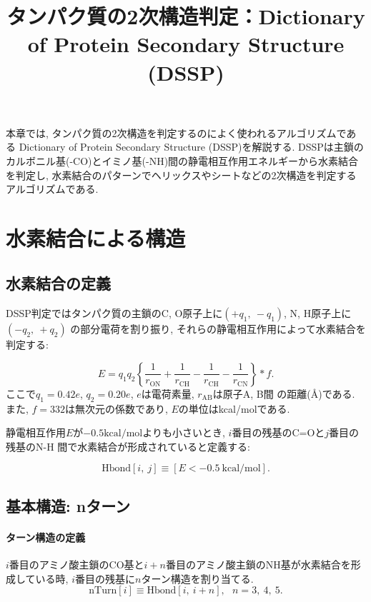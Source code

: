 





\title{タンパク質の2次構造判定：Dictionary of Protein Secondary Structure (DSSP)}
\maketitle

本章では, タンパク質の2次構造を判定するのによく使われるアルゴリズムである
Dictionary of Protein Secondary Structure (DSSP)\cite{Kabsch1983}を解説する.
DSSPは主鎖のカルボニル基(-CO)とイミノ基(-NH)間の静電相互作用エネルギーから水素結合を判定し,
水素結合のパターンでヘリックスやシートなどの2次構造を判定するアルゴリズムである.


\section{水素結合による構造}

\subsection{水素結合の定義}
DSSP判定ではタンパク質の主鎖のC, O原子上に$(+q_{1},~ -q_{1})$, N, H原子上に$(-q_{2},~ +q_{2})$
の部分電荷を割り振り, それらの静電相互作用によって水素結合を判定する:

\begin{equation}
 E = q_{1} q_{2}
     \left\{
              \frac{1}{r_{\mathrm{ON}}} + \frac{1}{r_{\mathrm{CH}}} 
            - \frac{1}{r_{\mathrm{CH}}} - \frac{1}{r_{\mathrm{CN}}} 
     \right\} * f .
\end{equation}
ここで$q_{1} = 0.42e$, $q_{2} = 0.20e$, $e$は電荷素量, $r_{\mathrm{AB}}$は原子A, B間
の距離(\AA)である. 
また, $f = 332$は無次元の係数であり, $E$の単位はkcal/molである.

静電相互作用$E$が$-0.5 \mathrm{kcal/mol}$よりも小さいとき, $i$番目の残基のC=Oと$j$番目の残基のN-H
間で水素結合が形成されていると定義する:

\begin{equation}
 \mathrm{H bond}[i,~ j]
 \equiv
 [E < -0.5 ~\mathrm{kcal/mol}] .
\end{equation}


\subsection{基本構造: nターン}
\paragraph{ターン構造の定義}
$i$番目のアミノ酸主鎖のCO基と$i+n$番目のアミノ酸主鎖のNH基が水素結合を形成している時, 
$i$番目の残基に$n$ターン構造を割り当てる.
\begin{equation}
 \mathrm{nTurn}[i]
 \equiv
 \mathrm{H bond}[i ,~ i  + n],
 ~~~
 n = 3,~ 4,~ 5.
\end{equation}

